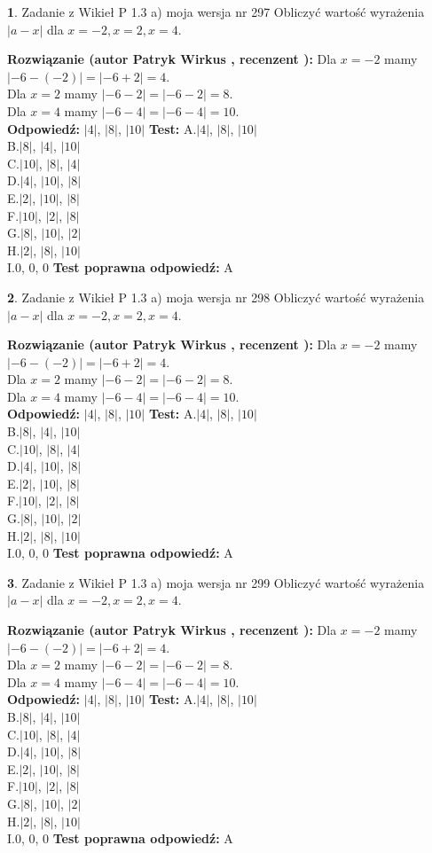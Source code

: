 \documentclass[12pt, a4paper]{article}
\theoremstyle{definition} %
\newtheorem{zad}{}
\newcommand{\zadStart}[1]{\begin{zad}#1\newline}
\newcommand{\zadStop}{\end{zad}}
\newcommand{\rozwStart}[2]{\noindent \textbf{Rozwiązanie (autor #1 , recenzent #2): }\newline}
\newcommand{\rozwStop}{\newline}
\newcommand{\odpStart}{\noindent \textbf{Odpowiedź:}\newline}
\newcommand{\odpStop}{\newline}
\newcommand{\testStart}{\noindent \textbf{Test:}\newline}
\newcommand{\testStop}{\newline}
\newcommand{\kluczStart}{\noindent \textbf{Test poprawna odpowiedź:}\newline}
\newcommand{\kluczStop}{\newline}
\begin{document}
\zadStart{Zadanie z Wikieł P 1.3 a) moja wersja nr 297}
Obliczyć wartość wyrażenia $|a - x|$ dla $x=-2,x=2,x=4$.
\zadStop
\rozwStart{Patryk Wirkus}{}
Dla $x = -2$ mamy $|-6 - (-2)| = |-6 + 2| = 4$.\\
Dla $x = 2$ mamy $|-6 - 2| = |-6 - 2| = 8$.\\
Dla $x = 4$ mamy $|-6 - 4| = |-6 - 4| = 10$.\\
\rozwStop
\odpStart
$|4|$, $|8|$, $|10|$
\odpStop
\testStart
A.$|4|$, $|8|$, $|10|$\\
B.$|8|$, $|4|$, $|10|$\\
C.$|10|$, $|8|$, $|4|$\\
D.$|4|$, $|10|$, $|8|$\\
E.$|2|$, $|10|$, $|8|$\\
F.$|10|$, $|2|$, $|8|$\\
G.$|8|$, $|10|$, $|2|$\\
H.$|2|$, $|8|$, $|10|$\\
I.$0$, $0$, $0$
\testStop
\kluczStart
A
\kluczStop



\zadStart{Zadanie z Wikieł P 1.3 a) moja wersja nr 298}
Obliczyć wartość wyrażenia $|a - x|$ dla $x=-2,x=2,x=4$.
\zadStop
\rozwStart{Patryk Wirkus}{}
Dla $x = -2$ mamy $|-6 - (-2)| = |-6 + 2| = 4$.\\
Dla $x = 2$ mamy $|-6 - 2| = |-6 - 2| = 8$.\\
Dla $x = 4$ mamy $|-6 - 4| = |-6 - 4| = 10$.\\
\rozwStop
\odpStart
$|4|$, $|8|$, $|10|$
\odpStop
\testStart
A.$|4|$, $|8|$, $|10|$\\
B.$|8|$, $|4|$, $|10|$\\
C.$|10|$, $|8|$, $|4|$\\
D.$|4|$, $|10|$, $|8|$\\
E.$|2|$, $|10|$, $|8|$\\
F.$|10|$, $|2|$, $|8|$\\
G.$|8|$, $|10|$, $|2|$\\
H.$|2|$, $|8|$, $|10|$\\
I.$0$, $0$, $0$
\testStop
\kluczStart
A
\kluczStop



\zadStart{Zadanie z Wikieł P 1.3 a) moja wersja nr 299}
Obliczyć wartość wyrażenia $|a - x|$ dla $x=-2,x=2,x=4$.
\zadStop
\rozwStart{Patryk Wirkus}{}
Dla $x = -2$ mamy $|-6 - (-2)| = |-6 + 2| = 4$.\\
Dla $x = 2$ mamy $|-6 - 2| = |-6 - 2| = 8$.\\
Dla $x = 4$ mamy $|-6 - 4| = |-6 - 4| = 10$.\\
\rozwStop
\odpStart
$|4|$, $|8|$, $|10|$
\odpStop
\testStart
A.$|4|$, $|8|$, $|10|$\\
B.$|8|$, $|4|$, $|10|$\\
C.$|10|$, $|8|$, $|4|$\\
D.$|4|$, $|10|$, $|8|$\\
E.$|2|$, $|10|$, $|8|$\\
F.$|10|$, $|2|$, $|8|$\\
G.$|8|$, $|10|$, $|2|$\\
H.$|2|$, $|8|$, $|10|$\\
I.$0$, $0$, $0$
\testStop
\kluczStart
A
\kluczStop
\end{document}
